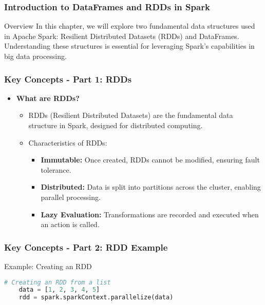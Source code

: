 \documentclass[aspectratio=169]{beamer}
\begin{document}
\frame{\titlepage}

\begin{frame}[fragile]
    \frametitle{Introduction to DataFrames and RDDs in Spark}
    \begin{block}{Overview}
        In this chapter, we will explore two fundamental data structures used in Apache Spark:
        Resilient Distributed Datasets (RDDs) and DataFrames. Understanding these structures is essential for leveraging Spark's capabilities in big data processing.
    \end{block}
\end{frame}

\begin{frame}[fragile]
    \frametitle{Key Concepts - Part 1: RDDs}
    \begin{itemize}
        \item \textbf{What are RDDs?}
        \begin{itemize}
            \item RDDs (Resilient Distributed Datasets) are the fundamental data structure in Spark, designed for distributed computing.
            \item Characteristics of RDDs:
            \begin{itemize}
                \item \textbf{Immutable:} Once created, RDDs cannot be modified, ensuring fault tolerance.
                \item \textbf{Distributed:} Data is split into partitions across the cluster, enabling parallel processing.
                \item \textbf{Lazy Evaluation:} Transformations are recorded and executed when an action is called.
            \end{itemize}
        \end{itemize}
    \end{itemize}
\end{frame}

\begin{frame}[fragile]
    \frametitle{Key Concepts - Part 2: RDD Example}
    \begin{block}{Example: Creating an RDD}
    \begin{lstlisting}[language=Python]
    # Creating an RDD from a list
    data = [1, 2, 3, 4, 5]
    rdd = spark.sparkContext.parallelize(data)
    \end{lstlisting}
    \end{block}
\end{frame}
\end{document}
